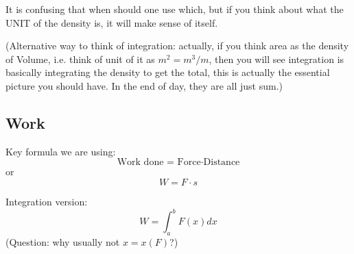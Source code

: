 \documentclass[12pt]{article}
\theoremstyle{definition}
\theoremstyle{definition}
\theoremstyle{remark}
\theoremstyle{definition}
\theoremstyle{definition}
\theoremstyle{definition}
\begin{document}
It is confusing that when should one use which, but if you think about what the UNIT of the density is, it will make sense of itself. 

(Alternative way to think of integration: actually, if you think area as the density of Volume, i.e. think of unit of it as $m^2=m^3/m$, then you will see integration is basically integrating the density to get the total, this is actually the essential picture you should have. In the end of day, they are all just sum.)


\subsection{Work}

Key formula we are using:\\\[
\text{Work done = Force} \cdot \text{Distance}\] or 
\[W=F\cdot s\]

Integration version:
\[W = \int^b_a F(x) dx\]
(Question: why usually not $x = x(F)$?)
\end{document}
